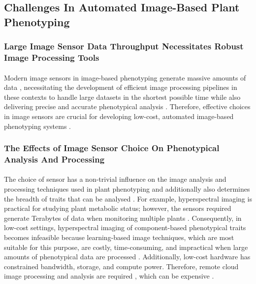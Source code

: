 \subsection{Challenges  In Automated Image-Based Plant Phenotyping}

\subsubsection{Large Image Sensor Data Throughput Necessitates Robust Image Processing Tools}
\paragraph{}
Modern image sensors in image-based phenotyping generate massive amounts of data \cite{gomesComputationalSustainabilityComputational2009}, necessitating the development of efficient image processing pipelines in these contexts to handle large datasets in the shortest possible time while also delivering precise and accurate phenotypical analysis \cite{minerviniImageAnalysisNew2015}.  Therefore, effective choices in image sensors are crucial for developing low-cost, automated image-based phenotyping systems \cite{zhangHighthroughputPhenotypingPlant2023}.

\subsubsection{The Effects of Image Sensor Choice On Phenotypical Analysis And Processing}
\paragraph{}
The choice of sensor has a non-trivial influence on the image analysis and processing techniques used in plant phenotyping and additionally also determines the breadth of traits that can be analysed \cite{liReviewImagingTechniques2014}. For example, hyperspectral imaging is practical for studying plant metabolic status; however, the sensors required generate Terabytes of data when monitoring multiple plants \cite{bauckhageDataMiningPattern2013}. Consequently, in low-cost settings, hyperspectral imaging of component-based phenotypical traits becomes infeasible because learning-based image techniques, which are most suitable for this purpose, are costly, time-consuming, and impractical when large amounts of phenotypical data are processed \cite{bauckhageDataMiningPattern2013}. Additionally, low-cost hardware has constrained bandwidth, storage, and compute power. Therefore, remote cloud image processing and analysis are required \cite{debaucheCloudArchitecturePlant2020}, which can be expensive \cite{minerviniImageAnalysisNew2015}.

